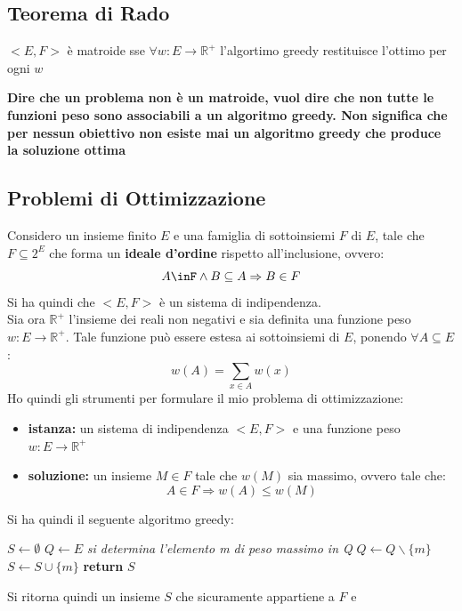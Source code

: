 \documentclass[a4paper,12pt, oneside]{book}
\begin{document}
\subsection{Teorema di Rado}
\begin{teorema}
  $<E,F>$ è matroide sse $\forall w:E\to \mathbb{R}^+$ l'algortimo
  greedy restituisce l'ottimo per ogni $w$
\end{teorema}
\textbf{Dire che un problema non è un matroide, vuol dire
  che non tutte le funzioni peso sono associabili a un algoritmo
  greedy. Non significa che per nessun obiettivo non esiste mai un
  algoritmo greedy che produce la soluzione ottima}\\
\subsection{Problemi di Ottimizzazione}
Considero un insieme finito $E$ e una famiglia di sottoinsiemi $F$ di
$E$, tale che $F\subseteq 2^E$ che forma un \textbf{ideale d'ordine}
rispetto all'inclusione, ovvero:
\[A\inF\wedge B\subseteq A\Rightarrow B\in F\]
Si ha quindi che $<E,F>$ è un sistema di indipendenza.\\
Sia ora $\mathbb{R}^{+}$ l'insieme dei reali non negativi e sia
definita una funzione peso $w:E\to\mathbb{R}^{+}$. Tale funzione può
essere estesa ai sottoinsiemi di $E$, ponendo $\forall A\subseteq E$:
\[w(A)=\sum_{x\in A}w(x)\]
Ho quindi gli strumenti per formulare il mio problema di
ottimizzazione:
\begin{itemize}
  \item \textbf{istanza:} un sistema di indipendenza $<E,F>$ e una
  funzione peso $w:E\to\mathbb{R}^{+}$
  \item \textbf{soluzione:} un insieme $M\in F$ tale che $w(M)$ sia
  massimo, ovvero tale che:
  \[A\in F\Rightarrow w(A)\leq w(M)\]
\end{itemize}
\newpage
Si ha quindi il seguente algoritmo greedy:
\begin{algorithm}[H]
  \begin{algorithmic}
    \State $S\gets \emptyset$
    \State $Q\gets E$
    \State \textit{si determina l'elemento m di peso massimo in Q}
    \State $Q\gets Q\backslash\{m\}$
    \State $S\gets S\cup \{m\}$
    \EndIf
    \EndWhile
    \State \textbf{return} $S$
    \EndFunction
  \end{algorithmic}
\end{algorithm}
Si ritorna quindi un insieme $S$ che sicuramente appartiene a $F$ e
\end{document}
